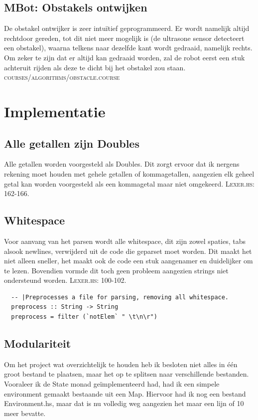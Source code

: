 \documentclass[12pt,a4paper]{report}
\begin{document}
\section{MBot: Obstakels ontwijken}
De obstakel ontwijker is zeer intuïtief geprogrammeerd. Er wordt namelijk altijd rechtdoor gereden, tot dit niet meer mogelijk is (de ultrasone sensor detecteert een obstakel), waarna telkens naar dezelfde kant wordt gedraaid, namelijk rechts. Om zeker te zijn dat er altijd kan gedraaid worden, zal de robot eerst een stuk achteruit rijden als deze te dicht bij het obstakel zou staan. \textsc{courses/algorithms/obstacle.course}

\chapter{Implementatie}
\section{Alle getallen zijn Doubles}
Alle getallen worden voorgesteld als Doubles. Dit zorgt ervoor dat ik nergens rekening moet houden met gehele getallen of kommagetallen, aangezien elk geheel getal kan worden voorgesteld als een kommagetal maar niet omgekeerd. \textsc{Lexer.hs: 162-166.}
\section{Whitespace}
Voor aanvang van het parsen wordt alle whitespace, dit zijn zowel spaties, tabs alsook newlines, verwijderd uit de code die geparset moet worden. Dit maakt het niet alleen sneller, het maakt ook de code een stuk aangenamer en duidelijker om te lezen. Bovendien vormde dit toch geen probleem aangezien strings niet ondersteund worden. \textsc{Lexer.hs: 100-102.}
\begin{lstlisting}
  -- |Preprocesses a file for parsing, removing all whitespace.
  preprocess :: String -> String
  preprocess = filter (`notElem` " \t\n\r")
\end{lstlisting}
\section{Modulariteit}
Om het project wat overzichtelijk te houden heb ik besloten niet alles in één groot bestand te plaatsen, maar het op te splitsen naar verschillende bestanden. Vooraleer ik de State monad geïmplementeerd had, had ik een simpele environment gemaakt bestaande uit een Map. Hiervoor had ik nog een bestand Environment.hs, maar dat is nu volledig weg aangezien het maar een lijn of 10 meer bevatte.
\end{document}
